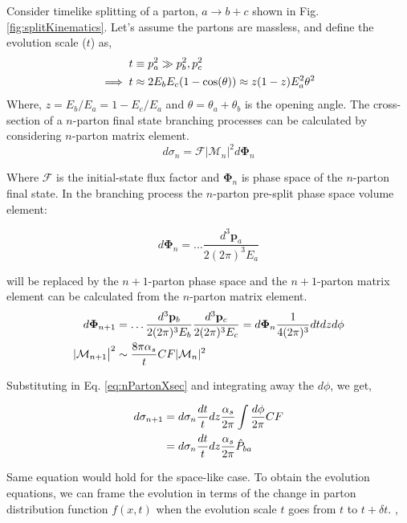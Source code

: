 Consider timelike splitting of a parton, \(a\to b+c\) shown in Fig. \ref{fig:splitKinematics}. Let's assume the partons are massless, and define the evolution scale (\(t\)) as, 
\begin{align}
	t &\equiv p_a^2 \gg p_b^2, p_c^2 \notag\\
	\implies t &\approx 2E_bE_c(1 - \cos(\theta))  \approx z(1-z)E_a^2\theta^2
\end{align}
Where, \(z = E_b/E_a = 1 - E_c/E_a\) and \(\theta = \theta_a + \theta_b\) is the opening angle.  The cross-section of a \(n\)-parton final state branching processes can be calculated by considering \(n\)-parton matrix element.
\begin{equation}
	\label{eq:nPartonXsec}
	d\sigma_n = \mathcal{F}|\mathcal{M}_n|^2d\mathbf{\Phi}_n
\end{equation}

Where \(\mathcal{F}\) is the initial-state flux factor and \(\mathbf{\Phi}_n\) is phase space of the \(n\)-parton final state. In the branching process the \(n\)-parton pre-split phase space volume element:

\begin{equation}
	d\mathbf{\Phi}_{n} = \ldots \frac{d^3\mathbf{p}_a}{2(2\pi)^3E_a}
\end{equation}

will be replaced by the \(n+1\)-parton phase space and the \(n+1\)-parton matrix element can be calculated from the \(n\)-parton matrix element. 
\begin{align}
	d\mathbf{\Phi}_{n+1} &= \ldots \frac{d^3\mathbf{p}_b}{2(2\pi)^3E_b} \frac{d^3\mathbf{p}_c}{2(2\pi)^3E_c} 
	= d\mathbf{\Phi}_{n} \frac{1}{4(2\pi)^3}dtdzd\phi \notag\\
	|\mathcal{M}_{n+1}\big|^2 &\sim \frac{8\pi\alpha_s}{t}CF|\mathcal{M}_n|^2
\end{align}




Substituting in Eq. \ref{eq:nPartonXsec} and integrating away the \(d\phi\), we get,

\begin{align}
	d\sigma_{n+1} &= d\sigma_n \frac{dt}{t}dz\frac{\alpha_s}{2\pi}\int\frac{d\phi}{2\pi}CF \notag\\
	&= d\sigma_n \frac{dt}{t}dz\frac{\alpha_s}{2\pi} \hat{P}_{ba}
\end{align}

Same equation would hold for the space-like case. To obtain the evolution equations, we can frame the evolution in terms of the change in parton distribution function \(f(x,t)\) when the evolution scale \(t\) goes from \(t\) to \(t+\delta t\).  ,

